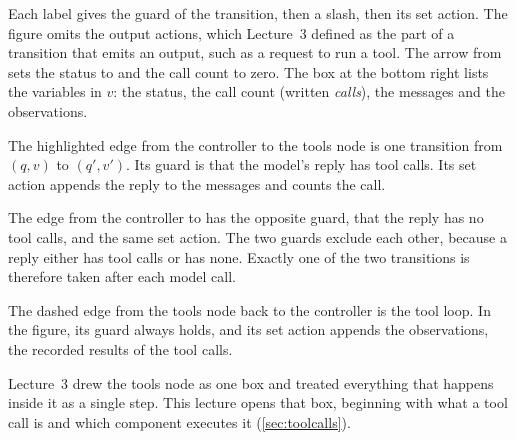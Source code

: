 Each label gives the guard of the transition, then a slash, then its set action. The figure omits
the output actions, which Lecture~3 defined as the part of a transition that emits an output, such
as a request to run a tool. The arrow from  sets the status to  and
the call count to zero. The box at the bottom right lists the variables in $v$: the status, the call
count (written \emph{calls}), the messages and the observations.

The highlighted edge from the controller to the tools node is one transition from $(q, v)$ to
$(q', v')$. Its guard is that the model's reply has tool calls. Its set action appends the reply to
the messages and counts the call.

The edge from the controller to  has the opposite guard, that the reply has no tool
calls, and the same set action. The two guards exclude each other, because a reply either has tool
calls or has none. Exactly one of the two transitions is therefore taken after each model call.

The dashed edge from the tools node back to the controller is the tool loop. In the figure, its guard
always holds, and its set action appends the observations, the recorded results of the tool calls.

Lecture~3 drew the tools node as one box and treated everything that happens inside it as a single
step. This lecture opens that box, beginning with what a tool call is and which component executes
it (\cref{sec:toolcalls}).

